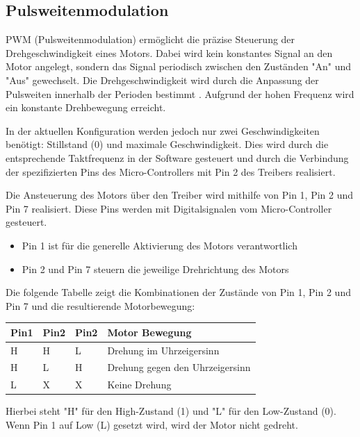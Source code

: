 \documentclass[conference,compsoc,final,a4paper]{IEEEtran}
\begin{document}
\subsection{Pulsweitenmodulation}

PWM (Pulsweitenmodulation) ermöglicht die präzise Steuerung der Drehgeschwindigkeit eines Motors. Dabei wird kein konstantes Signal an den Motor angelegt,
sondern das Signal periodisch zwischen den Zuständen "An" und "Aus" gewechselt. Die Drehgeschwindigkeit wird durch die Anpassung der Pulsweiten innerhalb der Perioden 
bestimmt \autocite{611797}. Aufgrund der hohen Frequenz wird ein konstante Drehbewegung erreicht. 

In der aktuellen Konfiguration werden jedoch nur zwei Geschwindigkeiten benötigt: Stillstand (0) und maximale Geschwindigkeit. 
Dies wird durch die entsprechende Taktfrequenz in der Software gesteuert und durch die Verbindung der 
spezifizierten Pins des Micro-Controllers mit Pin 2 des Treibers realisiert.

Die Ansteuerung des Motors über den Treiber wird mithilfe von Pin 1, Pin 2 und Pin 7 realisiert. 
Diese Pins werden mit Digitalsignalen vom Micro-Controller gesteuert.
\begin{itemize}
  \item Pin 1 ist für die generelle Aktivierung des Motors verantwortlich
  \item Pin 2 und Pin 7 steuern die jeweilige Drehrichtung des Motors
  \end{itemize}
  
Die folgende Tabelle zeigt die Kombinationen der Zustände von Pin 1, Pin 2 und Pin 7 und die resultierende Motorbewegung:

\begin{table}[]
  \begin{tabular}{llll}
  \hline
  \textbf{Pin1} & \textbf{Pin2} & \textbf{Pin2} & \textbf{Motor Bewegung}         \\ \hline
  H             & H             & L             & Drehung im Uhrzeigersinn        \\
  H             & L             & H             & Drehung gegen den Uhrzeigersinn \\
  L             & X             & X             & Keine Drehung                   \\ \hline
  \end{tabular}
  \end{table}

Hierbei steht "H" für den High-Zustand (1) und "L" für den Low-Zustand (0). Wenn Pin 1 auf Low (L) gesetzt wird, wird der Motor nicht gedreht.
\end{document}
